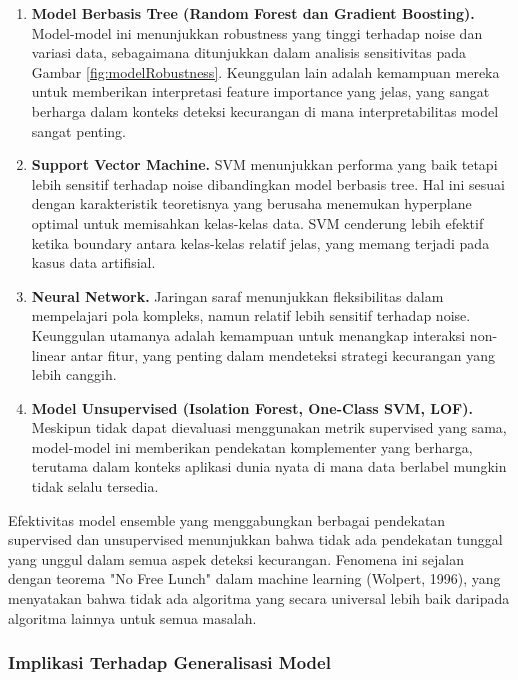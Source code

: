 \begin{enumerate}
    \item \textbf{Model Berbasis Tree (Random Forest dan Gradient Boosting).} Model-model ini menunjukkan robustness yang tinggi terhadap noise dan variasi data, sebagaimana ditunjukkan dalam analisis sensitivitas pada Gambar \ref{fig:modelRobustness}. Keunggulan lain adalah kemampuan mereka untuk memberikan interpretasi feature importance yang jelas, yang sangat berharga dalam konteks deteksi kecurangan di mana interpretabilitas model sangat penting.

    \item \textbf{Support Vector Machine.} SVM menunjukkan performa yang baik tetapi lebih sensitif terhadap noise dibandingkan model berbasis tree. Hal ini sesuai dengan karakteristik teoretisnya yang berusaha menemukan hyperplane optimal untuk memisahkan kelas-kelas data. SVM cenderung lebih efektif ketika boundary antara kelas-kelas relatif jelas, yang memang terjadi pada kasus data artifisial.

    \item \textbf{Neural Network.} Jaringan saraf menunjukkan fleksibilitas dalam mempelajari pola kompleks, namun relatif lebih sensitif terhadap noise. Keunggulan utamanya adalah kemampuan untuk menangkap interaksi non-linear antar fitur, yang penting dalam mendeteksi strategi kecurangan yang lebih canggih.

    \item \textbf{Model Unsupervised (Isolation Forest, One-Class SVM, LOF).} Meskipun tidak dapat dievaluasi menggunakan metrik supervised yang sama, model-model ini memberikan pendekatan komplementer yang berharga, terutama dalam konteks aplikasi dunia nyata di mana data berlabel mungkin tidak selalu tersedia.
\end{enumerate}

Efektivitas model ensemble yang menggabungkan berbagai pendekatan supervised dan unsupervised menunjukkan bahwa tidak ada pendekatan tunggal yang unggul dalam semua aspek deteksi kecurangan. Fenomena ini sejalan dengan teorema "No Free Lunch" dalam machine learning (Wolpert, 1996), yang menyatakan bahwa tidak ada algoritma yang secara universal lebih baik daripada algoritma lainnya untuk semua masalah.

\subsubsection{Implikasi Terhadap Generalisasi Model}

